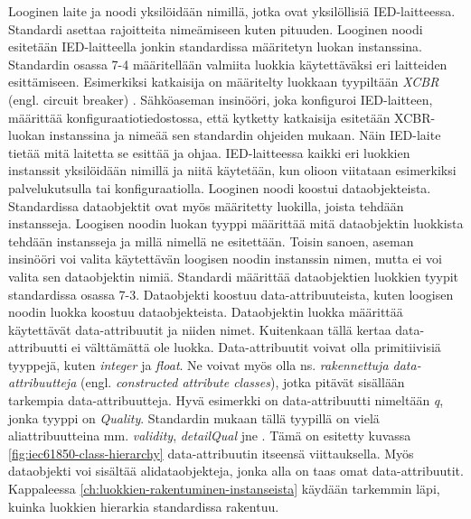 Looginen laite ja noodi yksilöidään nimillä, jotka ovat yksilöllisiä IED-laitteessa. Standardi asettaa rajoitteita nimeämiseen kuten pituuden. Looginen noodi esitetään IED-laitteella jonkin standardissa määritetyn luokan instanssina. Standardin osassa 7-4 määritellään valmiita luokkia käytettäväksi eri laitteiden esittämiseen. Esimerkiksi katkaisija on määritelty luokkaan tyypiltään \emph{XCBR} (engl. circuit breaker) \mbox{\cite[s.~105--106]{IEC61850-7-4}}. Sähköaseman insinööri, joka konfiguroi IED-laitteen, määrittää konfiguraatiotiedostossa, että kytketty katkaisija esitetään XCBR-luokan instanssina ja nimeää sen standardin ohjeiden mukaan. Näin IED-laite tietää mitä laitetta se esittää ja ohjaa. IED-laitteessa kaikki eri luokkien instanssit yksilöidään nimillä ja niitä käytetään, kun olioon viitataan esimerkiksi palvelukutsulla tai konfiguraatiolla. Looginen noodi koostui dataobjekteista. Standardissa dataobjektit ovat myös määritetty luokilla, joista tehdään instansseja. Loogisen noodin luokan tyyppi määrittää mitä dataobjektin luokkista tehdään instansseja ja millä nimellä ne esitettään. Toisin sanoen, aseman insinööri voi valita käytettävän loogisen noodin instanssin nimen, mutta ei voi valita sen dataobjektin nimiä. Standardi määrittää dataobjektien luokkien tyypit standardissa osassa 7-3. Dataobjekti koostuu data-attribuuteista, kuten loogisen noodin luokka koostuu dataobjekteista. Dataobjektin luokka määrittää käytettävät data-attribuutit ja niiden nimet. Kuitenkaan tällä kertaa data-attribuutti ei välttämättä ole luokka. Data-attribuutit voivat olla primitiivisiä tyyppejä, kuten \emph{integer} ja \emph{float}. Ne voivat myös olla ns. \emph{rakennettuja data-attribuutteja} (engl. \emph{constructed attribute classes}), jotka pitävät sisällään tarkempia data-attribuutteja. Hyvä esimerkki on data-attribuutti nimeltään \emph{q}, jonka tyyppi on \emph{Quality}. Standardin mukaan tällä tyypillä on vielä aliattribuutteina mm. \emph{validity}, \emph{detailQual} jne \mbox{\cite[s.~11]{IEC61850-7-3}}. Tämä on esitetty kuvassa \ref{fig:iec61850-class-hierarchy} data-attribuutin itseensä viittauksella. Myös dataobjekti voi sisältää alidataobjekteja, jonka alla on taas omat data-attribuutit. Kappaleessa \ref{ch:luokkien-rakentuminen-instanseista} käydään tarkemmin läpi, kuinka luokkien hierarkia standardissa rakentuu. \mbox{\cite{IEC61850-1, IEC61850-7-1, IEC61850-7-2, IEC61850-7-3}}


